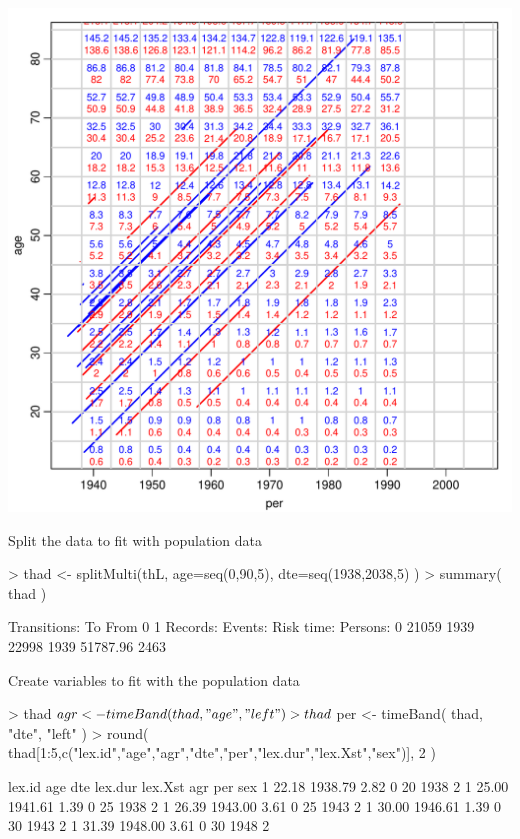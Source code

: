 \begin{frame}[fragile]
\includegraphics[height=0.99\textheight,keepaspectratio]{thL-lexis4}
\end{frame}

\begin{frame}[fragile]{Split the data to fit with population data}
\begin{Schunk}
\begin{Sinput}
> thad <- splitMulti(thL, age=seq(0,90,5), dte=seq(1938,2038,5) )
> summary( thad )
\end{Sinput}
\begin{Soutput}
Transitions:
     To
From     0    1  Records:  Events: Risk time:  Persons:
   0 21059 1939     22998     1939   51787.96      2463
\end{Soutput}
\end{Schunk}
\pause
\vspace*{-1em}
Create variables to fit with the population data
\vspace*{-1ex}
\begin{Schunk}
\begin{Sinput}
> thad$agr <- timeBand( thad, "age", "left" )
> thad$per <- timeBand( thad, "dte", "left" )
> round( thad[1:5,c("lex.id","age","agr","dte","per","lex.dur","lex.Xst","sex")], 2 )
\end{Sinput}
\begin{Soutput}
 lex.id   age     dte lex.dur lex.Xst agr  per sex
      1 22.18 1938.79    2.82       0  20 1938   2
      1 25.00 1941.61    1.39       0  25 1938   2
      1 26.39 1943.00    3.61       0  25 1943   2
      1 30.00 1946.61    1.39       0  30 1943   2
      1 31.39 1948.00    3.61       0  30 1948   2
\end{Soutput}
\end{Schunk}
\end{frame}

